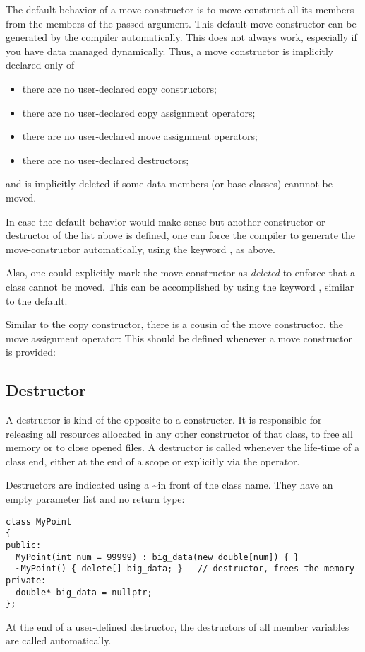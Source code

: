 The default behavior of a move-constructor is to move construct all its members from the members of the passed argument. This default move constructor
can be generated by the compiler automatically. This does not always work, especially if you have data managed dynamically. Thus, a move constructor is
implicitly declared only of
\begin{itemize}
  \item there are no user-declared copy constructors;
  \item there are no user-declared copy assignment operators;
  \item there are no user-declared move assignment operators;
  \item there are no user-declared destructors;
\end{itemize}

and is implicitly deleted if some data members (or base-classes) cannnot be moved.

In case the default behavior would make sense but another constructor or destructor of the list above is defined, one can force the compiler to generate
the move-constructor automatically, using the keyword , as above.

Also, one could explicitly mark the move constructor as \emph{deleted} to enforce that a class cannot be moved. This can be accomplished by using the
keyword , similar to the default.

Similar to the copy constructor, there is a cousin of the move constructor, the move assignment operator: This should be defined whenever a move constructor
is provided:


\subsection{Destructor\label{sec:destructor}}
A destructor is kind of the opposite to a constructer. It is responsible for releasing all resources allocated in any other constructor of that class, \eg
to free all memory or to close opened files. A destructor is called whenever the life-time of a class end, either at the end of a scope or explicitly via
the  operator.

Destructors are indicated using a \textasciitilde in front of the class name. They have an empty parameter list and no return type:
%
\begin{verbatim}
class MyPoint
{
public:
  MyPoint(int num = 99999) : big_data(new double[num]) { }
  ~MyPoint() { delete[] big_data; }   // destructor, frees the memory
private:
  double* big_data = nullptr;
};
\end{verbatim}
At the end of a user-defined destructor, the destructors of all member variables are called automatically.

